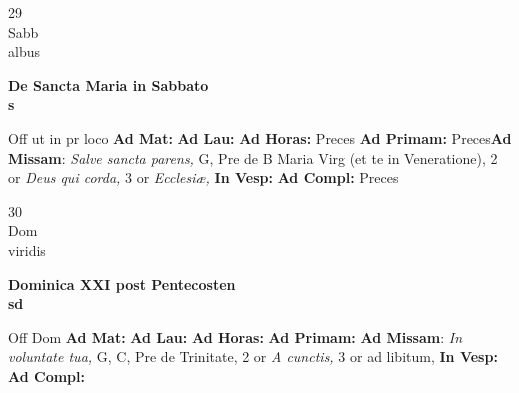 \documentclass[10pt, openany]{book}
\begin{document}
    \begin{center}
        \begin{minipage}{3.5in}
            \vspace{2em}
            \begin{minipage}{0.5in}
                {\Huge 29} \\
                {\normalsize Sabb} \\
                {\normalsize albus}
            \end{minipage}
            \begin{minipage}{3.0in}
                \textbf{ \large De Sancta Maria in Sabbato \\
                \textnormal{\normalsize s}} \\ 
            \end{minipage}
            \begin{justify}Off ut in pr loco
                \textbf{Ad Mat: }
                \textbf{Ad Lau: }
                \textbf{Ad Horas: }Preces
                \textbf{Ad Primam: }Preces\textbf{Ad Missam}: \textit{Salve sancta parens,} G, Pre de B Maria Virg (et te in Veneratione), 2 or \textit{Deus qui corda,} 3 or \textit{Ecclesiæ,}  
                \textbf{In Vesp: }
                \textbf{Ad Compl: }Preces
            \end{justify}
        \end{minipage}
    \end{center}

    \begin{center}
        \begin{minipage}{3.5in}
            \vspace{2em}
            \begin{minipage}{0.5in}
                {\Huge 30} \\
                {\normalsize Dom} \\
                {\normalsize viridis}
            \end{minipage}
            \begin{minipage}{3.0in}
                \textbf{ \large Dominica XXI post Pentecosten \\
                \textnormal{\normalsize sd}} \\ 
            \end{minipage}
            \begin{justify}Off Dom
                \textbf{Ad Mat: }
                \textbf{Ad Lau: }
                \textbf{Ad Horas: }
                \textbf{Ad Primam: }\textbf{Ad Missam}: \textit{In voluntate tua,} G, C, Pre de Trinitate, 2 or \textit{A cunctis,} 3 or ad libitum,  
                \textbf{In Vesp: }
                \textbf{Ad Compl: }
            \end{justify}
        \end{minipage}
    \end{center}
\end{document}
